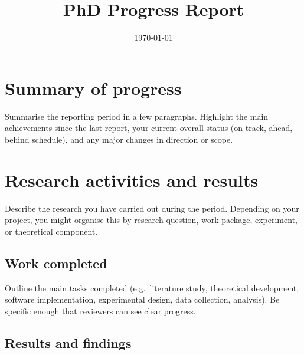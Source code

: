 \documentclass[sans,oneside,numeric,raggedright]{qreport}
\title{PhD Progress Report}
\date{\today}
\begin{document}
\maketitle



\section{Summary of progress}

Summarise the reporting period in a few paragraphs. Highlight the main
achievements since the last report, your current overall status (on track,
ahead, behind schedule), and any major changes in direction or scope.

\section{Research activities and results}

Describe the research you have carried out during the period. Depending on
your project, you might organise this by research question, work package,
experiment, or theoretical component.

\subsection{Work completed}

Outline the main tasks completed (e.g.\ literature study, theoretical
development, software implementation, experimental design, data collection,
analysis). Be specific enough that reviewers can see clear progress.

\subsection{Results and findings}
\end{document}
